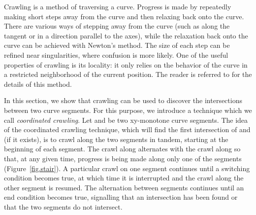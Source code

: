 
Crawling is a method of traversing a curve.  Progress is made by
repeatedly making short steps away from the curve and
then relaxing back onto the curve.
There are various ways of stepping away from the curve (such as
along the tangent or in a direction parallel to the axes), while the relaxation
back onto the curve can be achieved with Newton's method.
The size of each step can be refined near singularities, where confusion
is more likely.
One of the useful properties of crawling 
is its locality: it only relies on the behavior of the curve in a
restricted neighborhood of the current position.
The reader is referred to \cite{bhh,h,hl,or} for the details of this method.

In this section, we show that crawling can be used to discover
the intersections between two curve segments.
For this purpose, we introduce a technique
which we call {\it coordinated crawling}.
Let  and  be two xy-monotone curve segments.
The idea of the coordinated crawling technique, which will
find the first intersection of  and  (if it exists),
is to crawl
along the two segments in tandem, starting at the beginning of each segment.
The crawl along  alternates with the crawl along  so that,
at any given time, progress is being made along only one of the 
segments (Figure~\ref{fig.stair}).
A particular crawl on one segment
continues until a switching condition becomes true, at which
time it is interrupted and the crawl along the other segment is resumed.
The alternation between segments continues until an end condition becomes
true, signalling that an intersection has been found or that the two segments
do not intersect.

